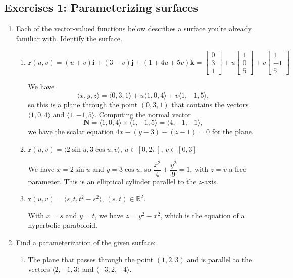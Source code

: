 \documentclass[12pt,letterpaper]{article}
\newcommand{\di}{\displaystyle}
\newcommand{\R}{\mathbb{R}}
\renewcommand{\r}{\mathbf{r}}
\renewcommand{\i}{\mathbf{i}}
\renewcommand{\j}{\mathbf{j}}
\renewcommand{\k}{\mathbf{k}}
\newcommand{\N}{\mathbf{N}}
\begin{document}
\subsection{Exercises 1: Parameterizing surfaces}
\begin{enumerate}
 \item Each of the vector-valued functions below describes a surface you're already familiar with. Identify the surface.
\begin{enumerate}
 \item $\di \r(u,v) = (u+v)\i+(3-v)\j+(1+4u+5v)\k = \begin{bmatrix}0\\3\\1\end{bmatrix}+u\begin{bmatrix}1\\0\\5\end{bmatrix}+v\begin{bmatrix}1\\-1\\5\end{bmatrix}$
 
 \bigskip
 
 We have 
 \[
 \langle x, y, z\rangle = \langle 0, 3, 1\rangle + u\langle 1, 0, 4\rangle + v\langle 1, -1, 5\rangle,
 \]
 so this is a plane through the point $(0,3,1)$ that contains the vectors $\langle 1, 0, 4\rangle$ and $\langle 1, -1, 5\rangle$. Computing the normal vector
 \[
 \N = \langle 1, 0, 4\rangle\times\langle 1, -1, 5\rangle = \langle 4, -1, -1\rangle,
 \]
 we have the scalar equation $4x-(y-3)-(z-1)=0$ for the plane.
 
 \item $\di \r(u,v) = \langle 2\sin u, 3\cos u, v\rangle$, $u\in [0,2\pi]$, $v\in [0,3]$

\bigskip

We have $x=2\sin u$ and $y=3\cos u$, so $\dfrac{x^2}{4}+\dfrac{y^2}{9} = 1$, with $z=v$ a free parameter. This is an elliptical cylinder parallel to the $z$-axis.

 \item $\di \r(u,v) = \langle s, t, t^2-s^2\rangle$, $(s,t)\in \R^2$.

\bigskip

With $x=s$ and $y=t$, we have $z=y^2-x^2$, which is the equation of a hyperbolic paraboloid.

\end{enumerate}
 \item Find a parameterization of the given surface:
\begin{enumerate}
 \item The plane that passes through the point $(1,2,3)$ and is parallel to the vectors $\langle 2,-1,3\rangle$ and $\langle -3, 2, -4\rangle$.


\end{enumerate}
\end{enumerate}
\end{document}
